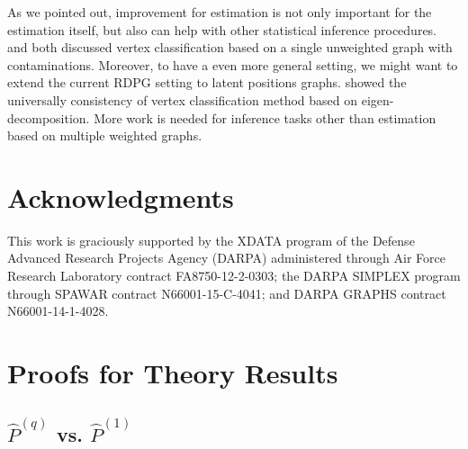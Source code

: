\documentclass[a4paper]{article}
\renewcommand{\hat}{\widehat}
\begin{document}
As we pointed out, improvement for estimation is not only important for the estimation itself, but also can help with other statistical inference procedures. \citet{priebe2015statistical} and \citet{chen2016robust} both discussed vertex classification based on a single unweighted graph with contaminations.
Moreover, to have a even more general setting, we might want to extend the current RDPG setting to latent positions graphs. \citet{tang2013universally} showed the universally consistency of vertex classification method based on eigen-decomposition.
More work is needed for inference tasks other than estimation based on multiple weighted graphs.


\section*{Acknowledgments}
This work is graciously supported by the XDATA program of the Defense
Advanced Research Projects Agency (DARPA) administered through Air
Force Research Laboratory contract FA8750-12-2-0303; the DARPA SIMPLEX
program through SPAWAR contract N66001-15-C-4041; and DARPA GRAPHS
contract N66001-14-1-4028.


{}




\appendix


\section{Proofs for Theory Results}

\subsection{$\hat{P}^{(q)}$ vs. $\hat{P}^{(1)}$}
\end{document}
